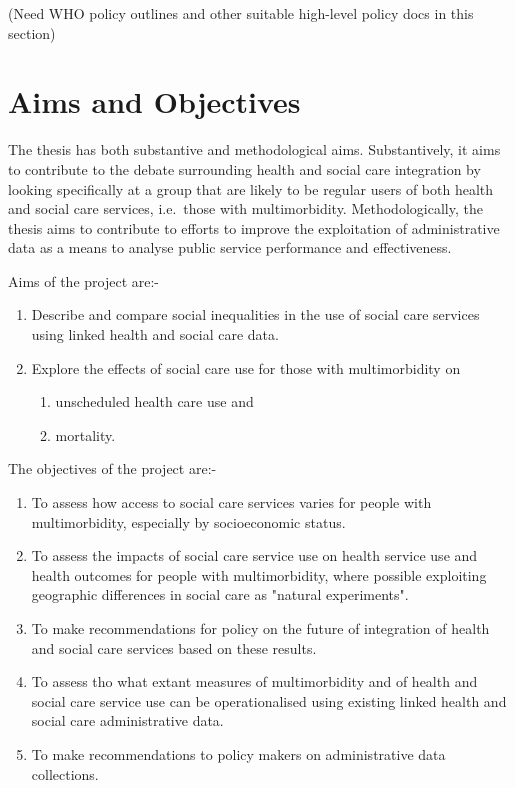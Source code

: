 \documentclass[12pt,]{report}
\begin{document}
(Need WHO policy outlines and other suitable high-level policy docs in
this section)

\section{Aims and Objectives}\label{sec:intro-aims-and-obs}

The thesis has both substantive and methodological aims. Substantively,
it aims to contribute to the debate surrounding health and social care
integration by looking specifically at a group that are likely to be
regular users of both health and social care services, i.e.~those with
multimorbidity. Methodologically, the thesis aims to contribute to
efforts to improve the exploitation of administrative data as a means to
analyse public service performance and effectiveness.

Aims of the project are:-

\begin{enumerate}[noitemsep]
\item Describe and compare social inequalities in the use of social care services using linked health and social care data.
\item Explore the effects of social care use for those with multimorbidity on 
\begin{enumerate} 
\item unscheduled health care use and
\item mortality. 
\end{enumerate}
\end{enumerate}

The objectives of the project are:-

\begin{enumerate}[noitemsep]
\item To assess how access to social care services varies for people with multimorbidity, especially by socioeconomic status.  
\item To assess the impacts of social care service use on health service use and health outcomes for people with multimorbidity, where possible exploiting geographic differences in social care as "natural experiments".
\item To make recommendations for policy on the future of integration of health and social care services based on these results.
\item To assess tho what extant measures of multimorbidity and of health and social care service use can be operationalised using existing linked health and social care administrative data.
\item To make recommendations to policy makers on administrative data collections. 
\end{enumerate}
\end{document}
